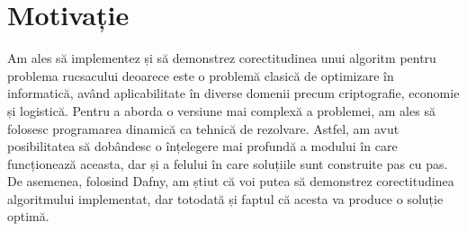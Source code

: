 \chapter*{Motivație} 

Am ales să implementez și să demonstrez corectitudinea unui algoritm pentru problema rucsacului deoarece este o problemă clasică de optimizare în informatică, având aplicabilitate în diverse domenii precum criptografie, economie și logistică. Pentru a aborda o versiune mai complexă a problemei, am ales să folosesc programarea dinamică ca tehnică de rezolvare. Astfel, am avut posibilitatea să dobândesc o înțelegere mai profundă a modului în care funcționează aceasta, dar și a felului în care soluțiile sunt construite pas cu pas. De asemenea, folosind Dafny, am știut că voi putea să demonstrez corectitudinea algoritmului implementat, dar totodată și faptul că acesta va produce o soluție optimă.
